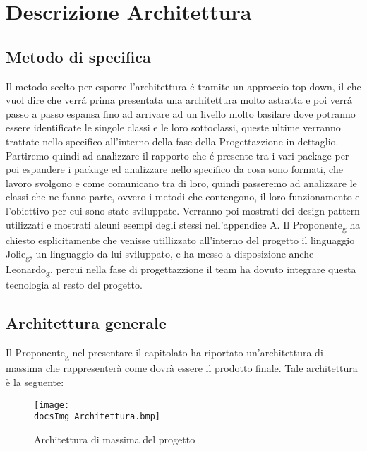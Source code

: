 \section{Descrizione Architettura}{
	
	\subsection{Metodo di specifica}{
	
	    Il metodo scelto per esporre l'architettura é tramite un approccio top-down, il che vuol dire che verrá prima presentata una architettura molto astratta e poi verrá passo a passo espansa fino ad arrivare 
	    ad un livello molto basilare dove potranno essere identificate le singole classi e le loro sottoclassi, queste ultime verranno trattate nello specifico all'interno della fase della Progettazzione in dettaglio. 
	    Partiremo quindi ad analizzare il rapporto che é presente tra i vari package per poi espandere i package ed analizzare nello specifico da cosa sono formati, che lavoro svolgono e come comunicano tra di loro,
	    quindi passeremo ad analizzare le classi che ne fanno parte, ovvero i metodi che contengono, il loro funzionamento e l'obiettivo per cui sono state sviluppate. Verranno poi mostrati dei design pattern utilizzati
	    e mostrati alcuni esempi degli stessi nell'appendice A.	Il Proponente\textsubscript{g} ha chiesto esplicitamente che venisse utillizzato all'interno del progetto il linguaggio Jolie\textsubscript{g}, un linguaggio da lui sviluppato,
	    e ha messo a disposizione anche Leonardo\textsubscript{g}, percui nella fase di progettazzione il team ha dovuto integrare questa tecnologia al resto del progetto.
		
	}
	\subsection{Architettura generale}{
		Il Proponente\textsubscript{g} nel presentare il capitolato ha riportato un'architettura di massima che rappresenterà come dovrà essere il prodotto finale. Tale architettura è la seguente:
	
		\begin{figure}[ht]
			\centering
			\texttt{[image: \\docsImg Architettura.bmp]}
			\caption{Architettura di massima del progetto}
			\label{Architettura di massima del progetto}
		\end{figure}
		
}}
